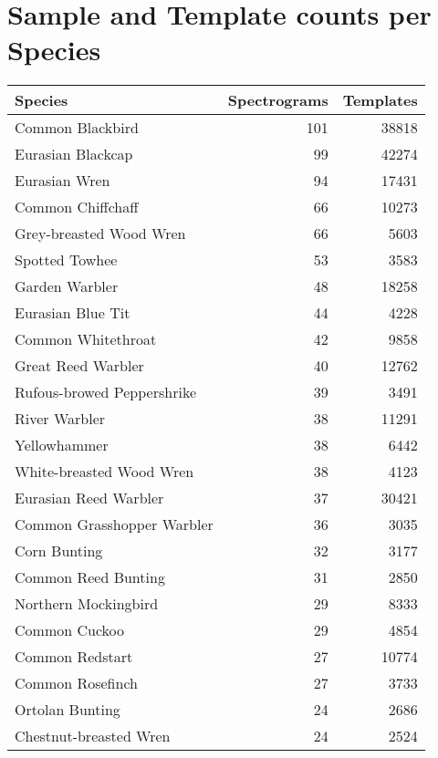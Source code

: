 \section{Sample and Template counts per Species}\label{app:samples}

  \begin{longtable}{l r r}
Species                         &Spectrograms &Templates \\ \hline
Common Blackbird                &101  &38818 \\
Eurasian Blackcap               &99   &42274 \\
Eurasian Wren                   &94   &17431 \\
Common Chiffchaff               &66   &10273 \\
Grey-breasted Wood Wren         &66   &5603  \\
Spotted Towhee                  &53   &3583  \\
Garden Warbler                  &48   &18258 \\
Eurasian Blue Tit               &44   &4228  \\
Common Whitethroat              &42   &9858  \\
Great Reed Warbler              &40   &12762 \\
Rufous-browed Peppershrike      &39   &3491  \\
River Warbler                   &38   &11291 \\
Yellowhammer                    &38   &6442  \\
White-breasted Wood Wren        &38   &4123  \\
Eurasian Reed Warbler           &37   &30421 \\
Common Grasshopper Warbler      &36   &3035  \\
Corn Bunting                    &32   &3177  \\
Common Reed Bunting             &31   &2850  \\
Northern Mockingbird            &29   &8333  \\
Common Cuckoo                   &29   &4854  \\
Common Redstart                 &27   &10774 \\
Common Rosefinch                &27   &3733  \\
Ortolan Bunting                 &24   &2686  \\
Chestnut-breasted Wren          &24   &2524  \\

\end{longtable}
